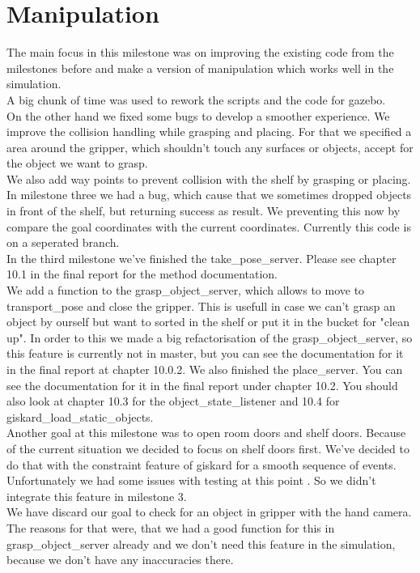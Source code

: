 \documentclass[main.tex]{subfiles}
\begin{document}
	
	\chapter{Manipulation}
	
	The main focus in this milestone was on improving the existing code from the milestones before and make a version of manipulation which works well in the simulation.\\
	A big chunk of time was used to rework the scripts and the code for gazebo.\\
	On the other hand we fixed some bugs to develop a smoother experience. We improve the collision handling while grasping and placing. For that we specified a area around the gripper, which shouldn't touch any surfaces or objects, accept for the object we want to grasp.\\
	We also add way points to prevent collision with the shelf by grasping or placing.\\
	In milestone three we had a bug, which cause that we sometimes dropped objects in front of the shelf, but returning success as result. We preventing this now by compare the goal coordinates with the current coordinates. Currently this code is on a seperated branch.\\
	In the third milestone we've finished the take\_pose\_server. Please see chapter 10.1 in the final report for the method documentation.\\
	We add a function to the grasp\_object\_server, which allows to move to transport\_pose and close the gripper. This is usefull in case we can't grasp an object by ourself but want to sorted in the shelf or put it in the bucket for "clean up". In order to this we made a big refactorisation of the grasp\_object\_server, so this feature is currently not in master, but you can see the documentation for it in the final report at chapter 10.0.2.
	We also finished the place\_server. You can see the documentation for it in the final report under chapter 10.2. You should also look at chapter 10.3 for the object\_state\_listener and 10.4 for giskard\_load\_static\_objects.\\
	Another goal at this milestone was to open room doors and shelf doors. Because of the current situation we decided to focus on shelf doors first. We've decided to do that with the constraint feature of giskard for a smooth sequence of events. Unfortunately we had some issues with testing at this point . So we didn't integrate this feature in milestone 3.\\
	We have discard our goal to check for an object in gripper with the hand camera. The reasons for that were, that we had a good function for this in grasp\_object\_server already and we don't need this feature in the simulation, because we don't have any inaccuracies there.
	
	
	
	


	
\end{document}
